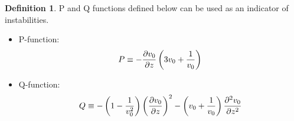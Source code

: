 \documentclass{article}
\theoremstyle{plain}
\theoremstyle{definition}
\newtheorem{definition}{Definition}
\theoremstyle{remark}
\theoremstyle{remark}
\begin{document}
\begin{definition}
    P and Q functions defined below can be used as an indicator of instabilities.
    \begin{itemize}
        \item P-function: 
        \begin{equation}
            P \equiv -\pdv{v_0}{z}\left(3v_0 + \frac{1}{v_0}\right)
            \label{eq:P-function}
        \end{equation}
        \item Q-function:
        \begin{equation}
            Q \equiv - \left(1-\frac{1}{v_0^2}\right)\left(\pdv{v_0}{z}\right)^2 
            - \left(v_0+\frac{1}{v_0}\right)\pdv[2]{v_0}{z}
            \label{eq:Q-function}
        \end{equation}
    \end{itemize}
\end{definition}
\end{document}
